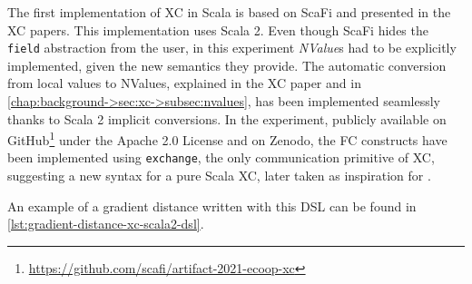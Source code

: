The first implementation of \ac{XC} in Scala is based on ScaFi and presented in the \ac{XC} papers\cite{xc}\cite{xc-experiment-with-scafi}.
%
This implementation uses Scala 2.
%
Even though ScaFi hides the \texttt{field} abstraction from the user, in this experiment \textit{NValue}s had to be explicitly implemented, given the new semantics they provide.
%
The automatic conversion from local values to NValues, explained in the \ac{XC} paper and in \cref{chap:background->sec:xc->subsec:nvalues}, has been implemented seamlessly thanks to Scala 2 implicit conversions.
%
In the experiment, publicly available on GitHub\footnote{\url{https://github.com/scafi/artifact-2021-ecoop-xc}} under the Apache 2.0 License and on Zenodo\cite{xc-experiment-with-scafi-code}, the \ac{FC} constructs have been implemented using \texttt{exchange}, the only communication primitive of \ac{XC}, suggesting a new syntax for a pure Scala \ac{XC}, later taken as inspiration for \this.

An example of a gradient distance written with this DSL can be found in \cref{lst:gradient-distance-xc-scala2-dsl}.


